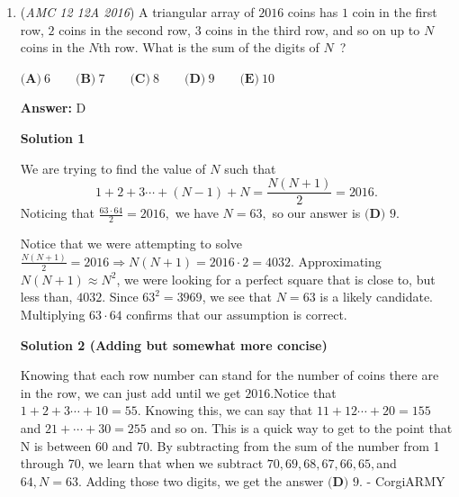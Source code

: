 \begin{enumerate}
 \textbf{Answer: }E



\textbf{Solution}

In this case, a counterexample is a number that would prove Goldbach's conjecture false. The conjecture asserts what \textbf{can} be done with \textbf{even} integers greater than 2.Therefore the solution is 
 \[{\textbf{(E)}\text{ an even integer greater than 2 that cannot be written as the sum of two prime numbers.}}\]

 \textbf{Note} Goldbach's conjecture has been proven for all integers less than $4 \cdot 10^{18}$, but the conjecture remains open. For more information, see \href{https://en.wikipedia.org/wiki/Goldbach\%27s\_conjecture}{the Wikipedia article}.

 


	\item (\textit{AMC 12 12A 2016}) A triangular array of $2016$ coins has $1$ coin in the first row, $2$ coins in the second row, $3$ coins in the third row, and so on up to $N$ coins in the $N$th row. What is the sum of the digits of $N$ ?


 $\textbf{(A)}\ 6\qquad\textbf{(B)}\ 7\qquad\textbf{(C)}\ 8\qquad\textbf{(D)}\ 9\qquad\textbf{(E)}\ 10$

 \textbf{Answer: }D



\textbf{Solution 1}

We are trying to find the value of $N$ such that 
 \[1+2+3\cdots+(N-1)+N=\frac{N(N+1)}{2}=2016.\] Noticing that $\frac{63\cdot 64}{2}=2016,$ we have $N=63,$ so our answer is $\boxed{\textbf{(D) } 9}.$

 Notice that we were attempting to solve $\frac{N(N+1)}{2} = 2016 \Rightarrow N(N+1) = 2016\cdot2 = 4032$. Approximating $N(N+1) \approx N^2$, we were looking for a perfect square that is close to, but less than, $4032$. Since $63^2 = 3969$, we see that $N = 63$ is a likely candidate.  Multiplying $63\cdot64$ confirms that our assumption is correct.

 



\textbf{Solution 2 (Adding but somewhat more concise)}

Knowing that each row number can stand for the number of coins there are in the row, we can just add until we get $2016$.Notice that $1 + 2 + 3 \cdots + 10 = 55.$ Knowing this, we can say that $11 + 12 \cdots + 20 = 155$ and $21 + \cdots +30 =255$ and so on. This is a quick way to get to the point that N is between 60 and 70. By subtracting from the sum of the number from 1 through 70, we learn that when we subtract $70, 69, 68, 67, 66, 65,$and $64, N = 63.$ Adding those two digits, we get the answer $\boxed{\textbf{(D) } 9}.$ - CorgiARMY


\end{enumerate}
